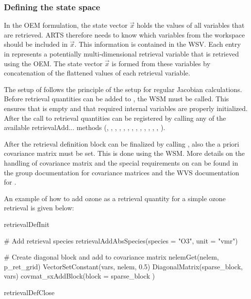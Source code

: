 \subsubsection{Defining the state space}

In the OEM formulation, the state vector $\vec{x}$ holds the values of all variables
that are retrieved.  ARTS therefore needs to know which variables from
the workspace should be included in  $\vec{x}$. This information is contained in the
 WSV. Each entry in 
represents a potentially multi-dimensional retrieval variable that is retrieved
using the OEM. The state vector $\vec{x}$ is formed from these variables by concatenation
of the flattened values of each retrieval variable.

The setup of  follows the principle of the setup for
regular Jacobian calculations. Before retrieval quantities can be added to
, the  WSM must be called.
This ensures that  is empty and that  required
internal variables are properly initialized. After the call to
  retrieval quantities can be registered by calling
 any of the available retrievalAdd... methods (, 
, ,
 , ,
, ,
, ,
, ,
, ,
).

After the retrieval definition block can be finalized by calling 
, also the a priori covariance matrix
  must be set. This is done using the
 WSM. More details on the handling of
covariance matrix and the special requirements on 
can be found in the group documentation for covariance matrices and
the WVS documentation for .

An example of how to add ozone as a retrieval quantity for a simple ozone
retrieval is given below:

\begin{code}
retrievalDefInit

# Add retrieval species
retrievalAddAbsSpecies(species = "O3", unit = "vmr")

# Create diagonal block and add to covariance matrix
nelemGet(nelem, p_ret_grid)
VectorSetConstant(vars, nelem, 0.5)
DiagonalMatrix(sparse_block, vars)
covmat_sxAddBlock(block = sparse_block )

retrievalDefClose
\end{code}

